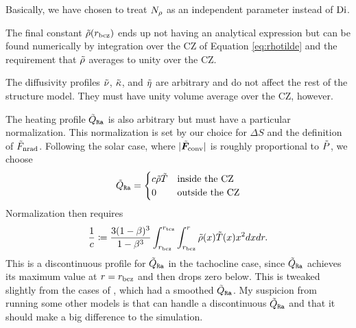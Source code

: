 \documentclass[12pt]{article}
\numberwithin{equation}{section}
\begin{document}
Basically, we have chosen to treat $N_\rho$ as an independent parameter instead of ${\rm{Di}}$. 

The final constant $\tilde{\rho}(r_{\rm bcz})$ ends up not having an analytical expression but can be found numerically by integration over the CZ of Equation \eqref{eq:rhotilde} and the requirement that $\tilde{\rho}$ averages to unity over the CZ.

The diffusivity profiles $\tilde{\nu}$, $\tilde{\kappa}$, and $\tilde{\eta}$ are arbitrary and do not affect the rest of the structure model. They must have unity volume average over the CZ, however. 

The heating profile $\tilde{Q}_{\texttt{Ra}}$ is also arbitrary but must have a particular normalization. This normalization is set by our choice for $\Delta S$ and the definition of $\tilde{F}_{\rm nrad}$. Following the solar case, where $|\tilde{\bm{F}}_{\rm conv}|$ is roughly proportional to $\tilde{P}$, we choose
\begin{align}
	\tilde{Q}_{\texttt{Ra}} = \begin{cases}
		c\tilde{\rho}\tilde{T} &\text{inside the CZ}\\
		0 & \text{outside the CZ}
	\end{cases}
\end{align}
Normalization then requires
\begin{align}
	\frac{1}{c} \coloneqq \frac{3(1-\beta)^3}{1-\beta^3}\int_{r_{\rm bcz}}^{r_{\rm tcz}}\int_{r_{\rm bcz}}^r \tilde{\rho}(x)\tilde{T}(x) x^2 dx dr. 
\end{align}
This is a discontinuous profile for $\tilde{Q}_{\texttt{Ra}}$ in the tachocline case, since $\tilde{Q}_{\texttt{Ra}}$ achieves its maximum value at $r=r_{\rm bcz}$ and then drops zero below. This is tweaked slightly from the cases of \citet{Matilsky2024}, which had a smoothed $\tilde{Q}_{\texttt{Ra}}$. My suspicion from running some other models is that {\rayleigh} can handle a discontinuous $\tilde{Q}_{\texttt{Ra}}$ and that it should make a big difference to the simulation. 
\end{document}
